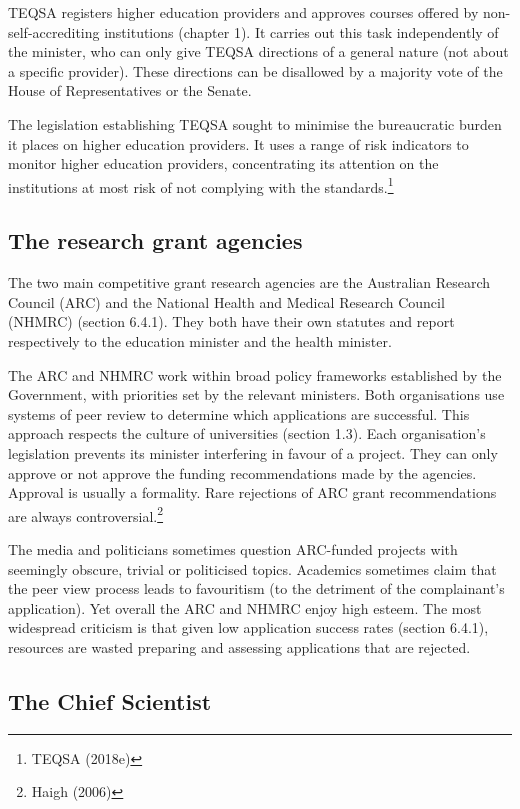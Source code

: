 \documentclass[]{book}
\begin{document}
TEQSA registers higher education providers and approves courses offered by non-self-accrediting institutions (chapter 1). It carries out this task independently of the minister, who can only give TEQSA directions of a general nature (not about a specific provider). These directions can be disallowed by a majority vote of the House of Representatives or the Senate.

The legislation establishing TEQSA sought to minimise the bureaucratic burden it places on higher education providers. It uses a range of risk indicators to monitor higher education providers, concentrating its attention on the institutions at most risk of not complying with the standards.\footnote{TEQSA (2018e)}

\hypertarget{the-research-grant-agencies}{%
\subsection{The research grant agencies}\label{the-research-grant-agencies}}

The two main competitive grant research agencies are the Australian Research Council (ARC) and the National Health and Medical Research Council (NHMRC) (section 6.4.1). They both have their own statutes and report respectively to the education minister and the health minister.

The ARC and NHMRC work within broad policy frameworks established by the Government, with priorities set by the relevant ministers. Both organisations use systems of peer review to determine which applications are successful. This approach respects the culture of universities (section 1.3). Each organisation's legislation prevents its minister interfering in favour of a project. They can only approve or not approve the funding recommendations made by the agencies. Approval is usually a formality. Rare rejections of ARC grant recommendations are always controversial.\footnote{Haigh (2006)}

The media and politicians sometimes question ARC-funded projects with seemingly obscure, trivial or politicised topics. Academics sometimes claim that the peer view process leads to favouritism (to the detriment of the complainant's application). Yet overall the ARC and NHMRC enjoy high esteem. The most widespread criticism is that given low application success rates (section 6.4.1), resources are wasted preparing and assessing applications that are rejected.

\hypertarget{the-chief-scientist}{%
\subsection{The Chief Scientist}\label{the-chief-scientist}}
\end{document}
